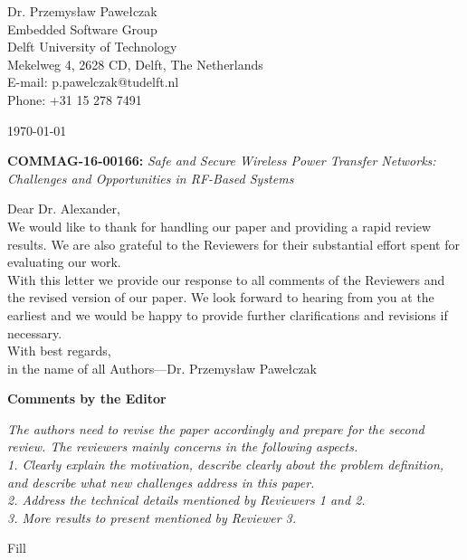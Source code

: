 \documentclass[10pt]{article}
\newcommand{\referee}[1]{{\item \color{OliveGreen} \emph{{#1}}}}
\newcommand{\response}[1]{{\color{blue} #1}}
\newenvironment{editor}{%
\textbf{\large Comments by the Editor}
\begin{enumerate}%
\renewcommand{\labelenumi}{\textbf{[E:\,\arabic{enumi}]}} %
}{\pagebreak\end{enumerate}}
\begin{document}
\pagestyle{myheadings}
\thispagestyle{empty}


\headsep 0.5cm

\bigskip\bigskip


\bigskip\bigskip

\begin{flushright}
Dr. Przemys{\l}aw Pawe{\l}czak \\
Embedded Software Group \\ 
Delft University of Technology \\ 
Mekelweg 4, 2628 CD, Delft, The Netherlands \\
E-mail: p.pawelczak@tudelft.nl\\
Phone: +31 15 278 7491\\
\end{flushright}

\vspace*{2cm}

\today
\medskip


\textbf{COMMAG-16-00166:} {\sl Safe and Secure Wireless Power Transfer Networks: Challenges and Opportunities in RF-Based Systems}

\bigskip

Dear Dr. Alexander,\\

We would like to thank for handling our paper and providing a rapid review results. We are also grateful to the Reviewers for their substantial effort spent for evaluating our work. \\

With this letter we provide our response to all comments of the Reviewers and the revised version of our paper. We look forward to hearing from you at the earliest and we would be happy to provide further clarifications and revisions if necessary. \\

With best regards, \\

in the name of all Authors---Dr. Przemys{\l}aw Pawe{\l}czak

\pagebreak

\begin{editor}
\referee{The authors need to revise the paper accordingly and prepare for the second review. The reviewers mainly concerns in the following aspects. \\
1. Clearly explain the motivation, describe clearly about the problem definition, and describe what new challenges address
in this paper. \\
2. Address the technical details mentioned by Reviewers 1 and 2. \\
3. More results to present mentioned by Reviewer 3.
}

\response{
	Fill
}

\end{editor}
\end{document}
